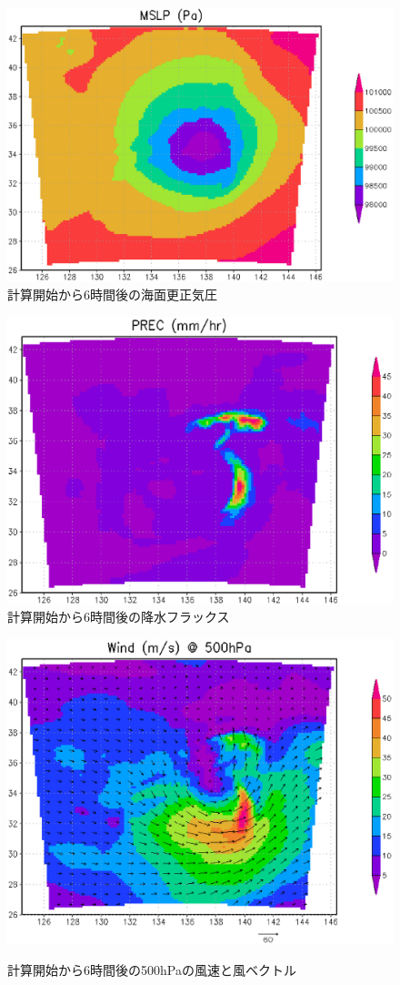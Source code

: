 \begin{figure}[h]
\begin{center}
  \includegraphics[width=0.55\hsize]{./figure/real_mslp.eps}\\
  \caption{計算開始から6時間後の海面更正気圧}
  \label{fig:real_mslp}
\end{center}
\begin{center}
  \includegraphics[width=0.55\hsize]{./figure/real_prec.eps}\\
  \caption{計算開始から6時間後の降水フラックス}
  \label{fig:real_prec}
\end{center}
\begin{center}
  \includegraphics[width=0.55\hsize]{./figure/real_wind.eps}\\
  \caption{計算開始から6時間後の500hPaの風速と風ベクトル}
  \label{fig:real_wind}
\end{center}
\end{figure}



